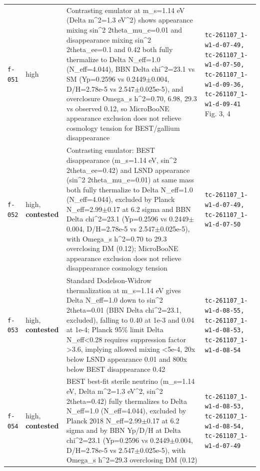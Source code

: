 \documentclass[11pt,a4paper]{article}
\begin{document}
\begin{longtable}{@{}p{}p{}p{}p{}@{}}
\texttt{f-051} & high & Contrasting emulator at m\_s=1.14 eV (Delta m\textasciicircum{}2=1.3 eV\textasciicircum{}2) shows appearance mixing sin\textasciicircum{}2 2theta\_mu\_e=0.01 and disappearance mixing sin\textasciicircum{}2 2theta\_ee=0.1 and 0.42 both fully thermalize to Delta N\_eff=1.0 (N\_eff=4.044), BBN Delta chi\textasciicircum{}2=23.1 vs SM (Yp=0.2596 vs 0.2449$\pm$0.004, D/H=2.78e-5 vs 2.547$\pm$0.025e-5), and overclosure Omega\_s h\textasciicircum{}2=0.70, 6.98, 29.3 vs observed 0.12, so MicroBooNE appearance exclusion does not relieve cosmology tension for BEST/gallium disappearance & \texttt{tc-261107\_\allowbreak{}1-w1-d-07-49,\allowbreak{} tc-261107\_\allowbreak{}1-w1-d-07-50,\allowbreak{} tc-261107\_\allowbreak{}1-w1-d-09-36,\allowbreak{} tc-261107\_\allowbreak{}1-w1-d-09-41} Fig. 3, 4 \\
\texttt{f-052} & high, \textbf{contested} & Contrasting emulator: BEST disappearance (m\_s=1.14 eV, sin\textasciicircum{}2 2theta\_ee=0.42) and LSND appearance (sin\textasciicircum{}2 2theta\_mu\_e=0.01) at same mass both fully thermalize to Delta N\_eff=1.0 (N\_eff=4.044), excluded by Planck N\_eff=2.99$\pm$0.17 at 6.2 sigma and BBN Delta chi\textasciicircum{}2=23.1 (Yp=0.2596 vs 0.2449$\pm$0.004, D/H=2.78e-5 vs 2.547$\pm$0.025e-5), with Omega\_s h\textasciicircum{}2=0.70 to 29.3 overclosing DM (0.12); MicroBooNE appearance exclusion does not relieve disappearance cosmology tension & \texttt{tc-261107\_\allowbreak{}1-w1-d-07-49,\allowbreak{} tc-261107\_\allowbreak{}1-w1-d-07-50} \\
\texttt{f-053} & high, \textbf{contested} & Standard Dodelson-Widrow thermalization at m\_s=1.14 eV gives Delta N\_eff=1.0 down to sin\textasciicircum{}2 2theta=0.01 (BBN Delta chi\textasciicircum{}2=23.1, excluded), falling to 0.40 at 1e-3 and 0.04 at 1e-4; Planck 95\% limit Delta N\_eff\textless{}0.28 requires suppression factor \textgreater{}3.6, implying allowed mixing \textless{}5e-4, 20x below LSND appearance 0.01 and 800x below BEST disappearance 0.42 & \texttt{tc-261107\_\allowbreak{}1-w1-d-08-55,\allowbreak{} tc-261107\_\allowbreak{}1-w1-d-08-53,\allowbreak{} tc-261107\_\allowbreak{}1-w1-d-08-54} \\
\texttt{f-054} & high, \textbf{contested} & BEST best-fit sterile neutrino (m\_s=1.14 eV, Delta m\textasciicircum{}2=1.3 eV\textasciicircum{}2, sin\textasciicircum{}2 2theta=0.42) fully thermalizes to Delta N\_eff=1.0 (N\_eff=4.044), excluded by Planck 2018 N\_eff=2.99$\pm$0.17 at 6.2 sigma and by BBN Yp/D/H at Delta chi\textasciicircum{}2=23.1 (Yp=0.2596 vs 0.2449$\pm$0.004, D/H=2.78e-5 vs 2.547$\pm$0.025e-5), with Omega\_s h\textasciicircum{}2=29.3 overclosing DM (0.12) & \texttt{tc-261107\_\allowbreak{}1-w1-d-08-53,\allowbreak{} tc-261107\_\allowbreak{}1-w1-d-08-54,\allowbreak{} tc-261107\_\allowbreak{}1-w1-d-07-49} \\

\end{longtable}
\end{document}
